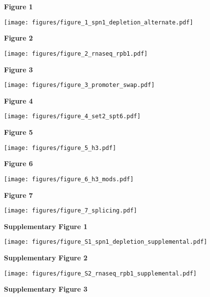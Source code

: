 \documentclass[9pt, letterpaper]{extarticle}
\begin{document}
\textbf{\large Figure 1}

{\texttt{[image: figures/figure\_1\_spn1\_depletion\_alternate.pdf]}\par}

\newpage

\textbf{\large Figure 2}

{\centering \texttt{[image: figures/figure\_2\_rnaseq\_rpb1.pdf]}\par}

\newpage

\textbf{\large Figure 3}

{\texttt{[image: figures/figure\_3\_promoter\_swap.pdf]}\par}

\newpage

\textbf{\large Figure 4}

{\centering \texttt{[image: figures/figure\_4\_set2\_spt6.pdf]}\par}

\newpage

\textbf{\large Figure 5}

{\texttt{[image: figures/figure\_5\_h3.pdf]}\par}

\newpage

\textbf{\large Figure 6}

{\centering \texttt{[image: figures/figure\_6\_h3\_mods.pdf]}\par}

\newpage

\textbf{\large Figure 7}

{\centering \texttt{[image: figures/figure\_7\_splicing.pdf]}\par}

\newpage

\textbf{\large Supplementary Figure 1}

{\centering \texttt{[image: figures/figure\_S1\_spn1\_depletion\_supplemental.pdf]}\par}

\newpage

\textbf{\large Supplementary Figure 2}

{\centering \texttt{[image: figures/figure\_S2\_rnaseq\_rpb1\_supplemental.pdf]}\par}

\newpage

\textbf{\large Supplementary Figure 3}
\end{document}
